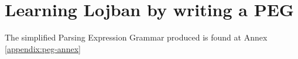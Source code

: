\chapter{Learning Lojban by writing a PEG}
\label{chap:writing-a-peg}

The simplified Parsing Expression Grammar produced is found at Annex \ref{appendix:peg-annex}